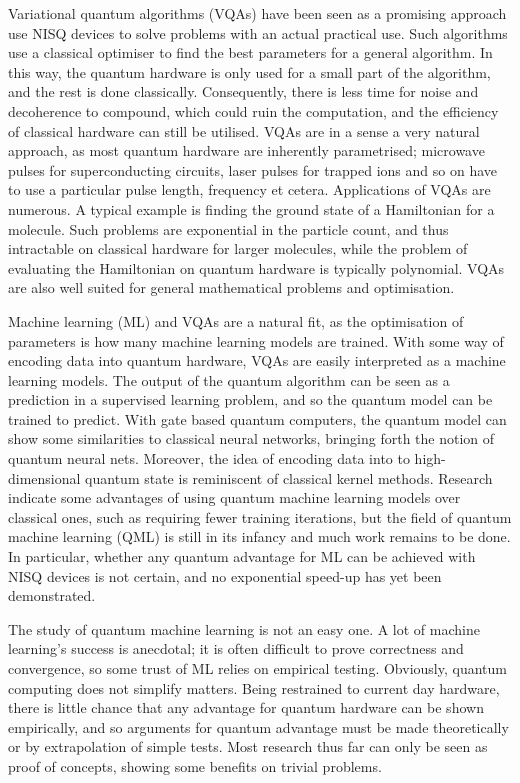 Variational quantum algorithms (VQAs) have been seen as a promising approach use NISQ devices to solve problems with an actual practical use.
Such algorithms use a classical optimiser to find the best parameters for a general algorithm.
In this way, the quantum hardware is only used for a small part of the algorithm, and the rest is done classically.
Consequently, there is less time for noise and decoherence to compound, which could ruin the computation, and the efficiency of classical hardware can still be utilised.
VQAs are in a sense a very natural approach, as most quantum hardware are inherently parametrised; microwave pulses for superconducting circuits, laser pulses for trapped ions and so on have to use a particular pulse length, frequency et cetera.
Applications of VQAs are numerous.
A typical example is finding the ground state of a Hamiltonian for a molecule.
Such problems are exponential in the particle count, and thus intractable on classical hardware for larger molecules, while the problem of evaluating the Hamiltonian on quantum hardware is typically polynomial.
VQAs are also well suited for general mathematical problems and optimisation.

Machine learning (ML) and VQAs are a natural fit, as the optimisation of parameters is how many machine learning models are trained.
With some way of encoding data into quantum hardware, VQAs are easily interpreted as a machine learning models.
The output of the quantum algorithm can be seen as a prediction in a supervised learning problem, and so the quantum model can be trained to predict.
With gate based quantum computers, the quantum model can show some similarities to classical neural networks, bringing forth the notion of quantum neural nets.
Moreover, the idea of encoding data into to high-dimensional quantum state is reminiscent of classical kernel methods.
Research indicate some advantages of using quantum machine learning models over classical ones, such as requiring fewer training iterations, but the field of quantum machine learning (QML) is still in its infancy and much work remains to be done.
In particular, whether any quantum advantage for ML can be achieved with NISQ devices is not certain, and no exponential speed-up has yet been demonstrated.

The study of quantum machine learning is not an easy one.
A lot of machine learning's success is anecdotal; it is often difficult to prove correctness and convergence, so some trust of ML relies on empirical testing.
Obviously, quantum computing does not simplify matters.
Being restrained to current day hardware, there is little chance that any advantage for quantum hardware can be shown empirically, and so arguments for quantum advantage must be made theoretically or by extrapolation of simple tests.
Most research thus far can only be seen as proof of concepts, showing some benefits on trivial problems.

